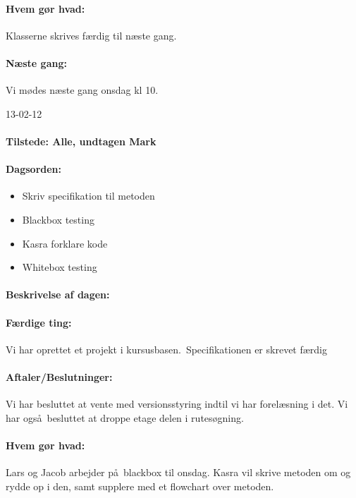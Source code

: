 \documentclass[a4paper,10pt,titlepage]{article}
\begin{document}
			\paragraph{Hvem g\o r hvad:}
			Klasserne skrives f\ae rdig til n\ae ste gang.\
			
			\paragraph{N\ae ste gang:}
			Vi m\o des n\ae ste gang onsdag kl 10.\mbox{}\\
			
			\begin{center}
		13-02-12
		\end{center}
				\paragraph{Tilstede: Alle, undtagen Mark}
				\paragraph{Dagsorden:}
				\begin{itemize}
					\item Skriv specifikation til metoden
					\item Blackbox testing
					\item Kasra forklare kode
					\item Whitebox testing
				\end{itemize}
				
			\paragraph{Beskrivelse af dagen:}
			
			\paragraph{F\ae rdige ting:}
			Vi har oprettet et projekt i kursusbasen.\
			Specifikationen er skrevet f\ae rdig
			
			\paragraph{Aftaler/Beslutninger:}
			Vi har besluttet at vente med versionsstyring indtil vi har forel\ae sning i det. Vi har ogs\aa \ besluttet at droppe etage delen i rutes\o gning. 
			
			\paragraph{Hvem g\o r hvad:}
			Lars og Jacob arbejder p\aa \ blackbox til onsdag. Kasra vil skrive metoden om og rydde op i den, samt supplere med et flowchart over metoden.
\end{document}
